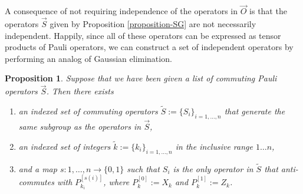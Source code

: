 \documentclass[twocolumn,showpacs,preprintnumbers,amsmath,amssymb,nofootinbib,pra,floatfix]{revtex4}
\newtheorem{proposition}{Proposition}
\newenvironment{remark}[1][Remark]{\begin{trivlist}
\item[\hskip \labelsep {\bfseries #1}]}{\end{trivlist}}
\newcommand{\lst}{\vec}
\newcommand{\set}{\tilde}
\begin{document}
\begin{remark}
A consequence of not requiring independence of the operators in $\lst O$ is that the operators $\lst S$ given by Proposition \ref{proposition-SG} are not necessarily independent.  Happily, since all of these operators can be expressed as tensor products of Pauli operators, we can construct a set of independent operators by performing an analog of Gaussian elimination.
\end{remark}

\begin{proposition}
\label{make-independent-using-elimination}
Suppose that we have been given a list of commuting Pauli operators $\lst S$.  Then there exists
\begin{enumerate}
\item an indexed set of commuting operators $\set S := \{S_i\}_{i=1,\dots,n}$ that generate the same subgroup as the operators in $\lst S$,
\item an indexed set of integers $\set k := \{k_i\}_{i=1,\dots,n}$ in the inclusive range $1\dots n$,
\item and a map $s:1,\dots, n \to \{0,1\}$ such that $S_i$ is the only operator in $\set S$ that anti-commutes with $P_{k_i}^{[s(i)]}$, where $P_k^{[0]}:=X_k$ and $P_k^{[1]}:=Z_k$.
\end{enumerate}
\end{proposition}
\end{document}
